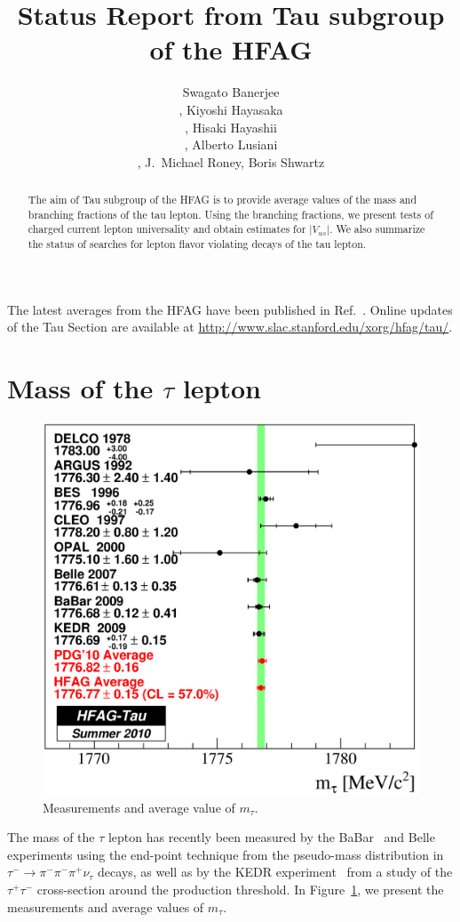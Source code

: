 \documentclass[fleqn,twoside]{article}
\title{Status Report from Tau subgroup of the HFAG}
\author{Swagato Banerjee\address[UVIC]{University of Victoria, Canada.},
        Kiyoshi Hayasaka\address{Nagoya University, Japan.},
        Hisaki Hayashii\address{Nara Womana's University, Japan.},
        Alberto Lusiani\address{Scuola Normale Superiore and INFN Pisa, Italy.},
        J.~Michael Roney\addressmark[UVIC],
        Boris Shwartz\address{Budker Institute of Nuclear Physics, Russia.}}
\begin{document}
\begin{abstract}
The aim of Tau subgroup of the HFAG is to provide average values
of the mass and branching fractions of the tau lepton.
Using the branching fractions, we present tests of charged current
lepton universality and obtain estimates for $|V_{us}|$.
We also summarize the status of searches for lepton flavor violating
decays of the tau lepton.
\vspace{1pc}
\end{abstract}

\maketitle

The latest averages from the HFAG have been published in Ref.~\cite{HFAG:2010qj}.
Online updates of the Tau Section are available at \url{http://www.slac.stanford.edu/xorg/hfag/tau/}.

\section{Mass of the $\tau$ lepton}
\label{sec:Tau_Mass}

\begin{figure}[!hbtp]
\begin{center}
\includegraphics[height=.42\textheight,width=.49\textwidth]{figures/TauMass.eps}
\end{center}
\caption{Measurements and average value of $m_\tau$.}
\label{fig:Tau_Mass}
\end{figure}

The mass of the $\tau$ lepton has recently been measured by the BaBar~\cite{Aubert:2009ra} and Belle~\cite{Abe:2006vf} experiments
using the end-point technique from the pseudo-mass distribution in $\tau^-\to\pi^-\pi^-\pi^+\nu_\tau$ decays,
as well as by the KEDR experiment~\cite{Shamov:2009zz} from a study of the $\tau^+\tau^-$ cross-section around the production threshold.
In Figure~\ref{fig:Tau_Mass}, we present the measurements and average values of $m_\tau$.
\end{document}
